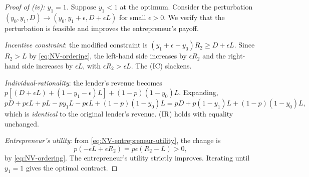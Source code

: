 \documentclass[11pt,a4paper,oneside]{book}
\def\geq{\geqslant}
\theoremstyle{plain}
\theoremstyle{definition}
\theoremstyle{remark}
\numberwithin{equation}{chapter}
\begin{document}
\begin{proof}[Proof of (iv): $y_1 = 1$]
Suppose $y_1 < 1$ at the optimum.
Consider the perturbation $(y_0, y_1, D) \to (y_0, y_1 + \epsilon, D + \epsilon L)$ for small $\epsilon > 0$.
We verify that the perturbation is feasible and improves the entrepreneur's payoff.

\emph{Incentive constraint}: the modified constraint is $(y_1 + \epsilon - y_0) R_2 \geq D + \epsilon L$.
Since $R_2 > L$ by \eqref{eq:NV-ordering}, the left-hand side increases by $\epsilon R_2$ and the right-hand side increases by $\epsilon L$, with $\epsilon R_2 > \epsilon L$.
The (IC) slackens.

\emph{Individual-rationality}: the lender's revenue becomes $p[(D + \epsilon L) + (1 - y_1 - \epsilon) L] + (1 - p)(1 - y_0) L$.
Expanding,
\begin{equation*}
  p D + p \epsilon L + p L - p y_1 L - p \epsilon L + (1 - p)(1 - y_0) L = p D + p (1 - y_1) L + (1 - p)(1 - y_0) L,
\end{equation*}
which is \emph{identical} to the original lender's revenue.
(IR) holds with equality unchanged.

\emph{Entrepreneur's utility}: from \eqref{eq:NV-entrepreneur-utility}, the change is
\begin{equation*}
  p(-\epsilon L + \epsilon R_2) = p \epsilon (R_2 - L) > 0,
\end{equation*}
by \eqref{eq:NV-ordering}.
The entrepreneur's utility strictly improves.
Iterating until $y_1 = 1$ gives the optimal contract.
\end{proof}
\end{document}
